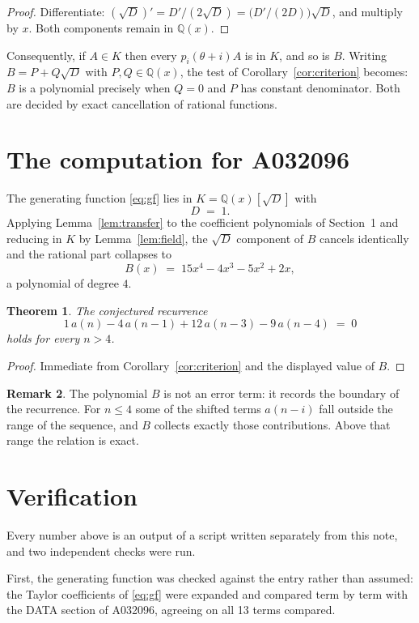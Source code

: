 \documentclass[11pt,a4paper]{article}
\theoremstyle{plain}
\newtheorem{theorem}{Theorem}
\theoremstyle{definition}
\newtheorem{remark}[theorem]{Remark}
\begin{document}
\begin{proof}
Differentiate: $(\sqrt{D})'=D'/(2\sqrt{D})=\bigl(D'/(2D)\bigr)\sqrt{D}$, and multiply by
$x$. Both components remain in $\mathbb{Q}(x)$.
\end{proof}

Consequently, if $A\in K$ then every $p_{i}(\theta+i)A$ is in $K$, and so is $B$. Writing
$B=P+Q\sqrt{D}$ with $P,Q\in\mathbb{Q}(x)$, the test of Corollary~\ref{cor:criterion}
becomes: $B$ is a polynomial precisely when $Q=0$ and $P$ has constant denominator. Both
are decided by exact cancellation of rational functions.

\section{The computation for A032096}

The generating function \eqref{eq:gf} lies in $K=\mathbb{Q}(x)[\sqrt{D}]$ with
\[
D \;=\; 1 .
\]
Applying Lemma~\ref{lem:transfer} to the coefficient polynomials of Section~1 and reducing
in $K$ by Lemma~\ref{lem:field}, the $\sqrt{D}$ component of $B$ cancels identically and
the rational part collapses to
\[
B(x)\;=\;15 x^{4} - 4 x^{3} - 5 x^{2} + 2 x ,
\]
a polynomial of degree $4$.

\begin{theorem}
The conjectured recurrence
\[
1\,a(n) - 4\,a(n-1) + 12\,a(n-3) - 9\,a(n-4) \;=\;0
\]
holds for every $n>4$.
\end{theorem}

\begin{proof}
Immediate from Corollary~\ref{cor:criterion} and the displayed value of $B$.
\end{proof}

\begin{remark}
The polynomial $B$ is not an error term: it records the boundary of the recurrence. For
$n\le4$ some of the shifted terms $a(n-i)$ fall outside the range of the sequence,
and $B$ collects exactly those contributions. Above that range the relation is exact.
\end{remark}

\section{Verification}

Every number above is an output of a script written separately from this note, and two
independent checks were run.

First, the generating function was checked against the entry rather than assumed: the
Taylor coefficients of \eqref{eq:gf} were expanded and compared term by term with the DATA
section of A032096, agreeing on all 13 terms compared.
\end{document}
